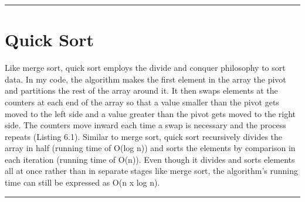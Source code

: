 \documentclass[letterpaper, 10pt,DIV=13]{scrartcl}
\numberwithin{equation}{section} %
\numberwithin{figure}{section} %
\numberwithin{table}{section} %
\newcommand{\horrule}[1]{\rule{\linewidth}{#1}} %
\begin{document}
\horrule{0pt}  	%

\section{Quick Sort}\label{operations}
Like merge sort, quick sort employs the divide and conquer philosophy to sort data. In my code, the algorithm makes the first element in the array the pivot and partitions the rest of the array around it. It then swaps elements at the counters at each end of the array so that a value smaller than the pivot gets moved to the left side and a value greater than the pivot gets moved to the right side. The counters move inward each time a swap is necessary and the process repeats (Listing 6.1). Similar to merge sort, quick sort recursively divides the array in half (running time of O(log n)) and sorts the elements by comparison in each iteration (running time of O(n)). Even though it divides and sorts elements all at once rather than in separate stages like merge sort, the algorithm's running time can still be expressed as O(n x log n).

\horrule{0pt}  	%
\end{document}
